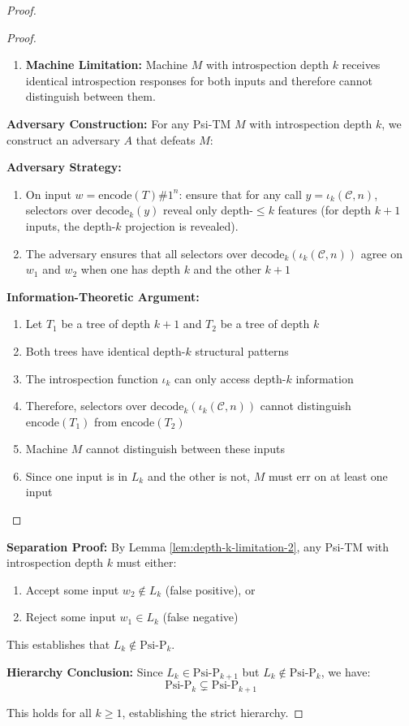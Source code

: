 \begin{proof}
\begin{proof}
\begin{enumerate}
\item \textbf{Machine Limitation:}
  Machine $M$ with introspection depth $k$ receives identical introspection responses for both inputs and therefore cannot distinguish between them.
\end{enumerate}

\textbf{Adversary Construction:}
For any Psi-TM $M$ with introspection depth $k$, we construct an adversary $A$ that defeats $M$:

\textbf{Adversary Strategy:}
\begin{enumerate}
\item On input $w = \text{encode}(T)\#1^n$:
  ensure that for any call $y=\iota_k(\mathcal{C},n)$, selectors over $\mathrm{decode}_k(y)$ reveal only depth-$\le k$ features (for depth $k{+}1$ inputs, the depth-$k$ projection is revealed).
\item The adversary ensures that all selectors over $\mathrm{decode}_k(\iota_k(\mathcal{C},n))$ agree on $w_1$ and $w_2$ when one has depth $k$ and the other $k{+}1$
\end{enumerate}

\textbf{Information-Theoretic Argument:}
\begin{enumerate}
\item Let $T_1$ be a tree of depth $k+1$ and $T_2$ be a tree of depth $k$
\item Both trees have identical depth-$k$ structural patterns
\item The introspection function $\iota_k$ can only access depth-$k$ information
\item Therefore, selectors over $\mathrm{decode}_k(\iota_k(\mathcal{C},n))$ cannot distinguish $\text{encode}(T_1)$ from $\text{encode}(T_2)$
\item Machine $M$ cannot distinguish between these inputs
\item Since one input is in $L_k$ and the other is not, $M$ must err on at least one input
\end{enumerate}
\end{proof}

\textbf{Separation Proof:}
By Lemma \ref{lem:depth-k-limitation-2}, any Psi-TM with introspection depth $k$ must either:
\begin{enumerate}
\item Accept some input $w_2 \notin L_k$ (false positive), or
\item Reject some input $w_1 \in L_k$ (false negative)
\end{enumerate}

This establishes that $L_k \notin \text{Psi-P}_k$.

\textbf{Hierarchy Conclusion:}
Since $L_k \in \text{Psi-P}_{k+1}$ but $L_k \notin \text{Psi-P}_k$, we have:
$$\text{Psi-P}_k \subsetneq \text{Psi-P}_{k+1}$$

This holds for all $k \geq 1$, establishing the strict hierarchy.
\end{proof}

